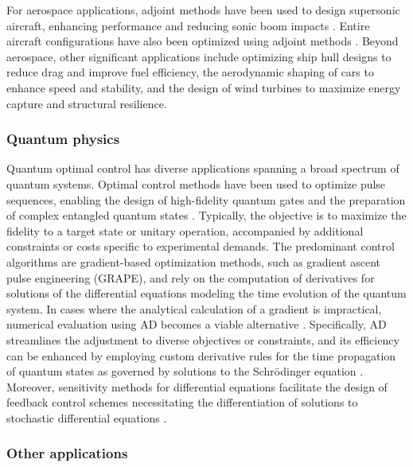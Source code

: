 For aerospace applications, adjoint methods have been used to design supersonic aircraft, enhancing performance and reducing sonic boom impacts \cite{hu2010supersonic,fike2013multi}. 
Entire aircraft configurations have also been optimized using adjoint methods \cite{chen2016aerodynamic}. 
Beyond aerospace, other significant applications include optimizing ship hull designs to reduce drag and improve fuel efficiency, the aerodynamic shaping of cars to enhance speed and stability, and the design of wind turbines to maximize energy capture and structural resilience.

\subsubsection{Quantum physics}

Quantum optimal control has diverse applications spanning a broad spectrum of quantum systems. 
Optimal control methods have been used to optimize pulse sequences, enabling the design of high-fidelity quantum gates and the preparation of complex entangled quantum states \cite{koch2022quantum}. 
Typically, the objective is to maximize the fidelity to a target state or unitary operation, accompanied by additional constraints or costs specific to experimental demands. 
The predominant control algorithms are gradient-based optimization methods, such as gradient ascent pulse engineering (GRAPE), and rely on the computation of derivatives for solutions of the differential equations modeling the time evolution of the quantum system. 
In cases where the analytical calculation of a gradient is impractical, numerical evaluation using AD becomes a viable alternative \cite{jirari:2009, leung:2017, abdelhafez:2019, jirari2019quantum, abdelhafez:2020, schaefer:2020, goerz:2022}. 
Specifically, AD streamlines the adjustment to diverse objectives or constraints, and its efficiency can be enhanced by employing custom derivative rules for the time propagation of quantum states as governed by solutions to the Schrödinger equation \cite{goerz:2022}. 
Moreover, sensitivity methods for differential equations facilitate the design of feedback control schemes necessitating the differentiation of solutions to stochastic differential equations \cite{schaefer:2021}.

\subsubsection{Other applications}

